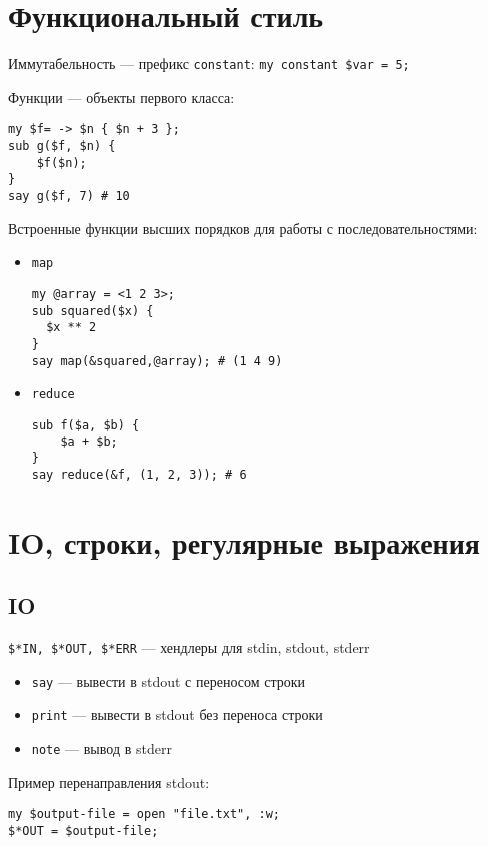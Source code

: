 \documentclass[12pt,a4paper,oneside,titlepage]{article}
\begin{document}
\begin{multicols*}{2}
  \section{Функциональный стиль}

   Иммутабельность --- префикс \lstinline|constant|:
   \lstinline|my constant $var = 5;|

   Функции --- объекты первого класса:

   \begin{lstlisting}
my $f= -> $n { $n + 3 };
sub g($f, $n) {
    $f($n);
}
say g($f, 7) # 10
   \end{lstlisting}

   Встроенные функции высших порядков для работы с последовательностями:
   \begin{itemize}
     \item{\lstinline|map|
           \begin{lstlisting}
my @array = <1 2 3>;
sub squared($x) {
  $x ** 2
}
say map(&squared,@array); # (1 4 9)
           \end{lstlisting}}
     \item{\lstinline|reduce|
           \begin{lstlisting}
sub f($a, $b) {
    $a + $b;
}
say reduce(&f, (1, 2, 3)); # 6
           \end{lstlisting}}
   \end{itemize}

  \section{IO, строки, регулярные выражения}

  \subsection{IO}
  \lstinline|$*IN, $*OUT, $*ERR| --- хендлеры для stdin, stdout, stderr

  \begin{itemize}
    \item{\lstinline|say|} --- вывести в stdout с переносом строки
    \item{\lstinline|print|} --- вывести в stdout без переноса строки
    \item{\lstinline|note|} --- вывод в stderr
  \end{itemize}

  Пример перенаправления stdout:

  \begin{lstlisting}
my $output-file = open "file.txt", :w;
$*OUT = $output-file;
  \end{lstlisting}


\end{multicols*}
\end{document}
